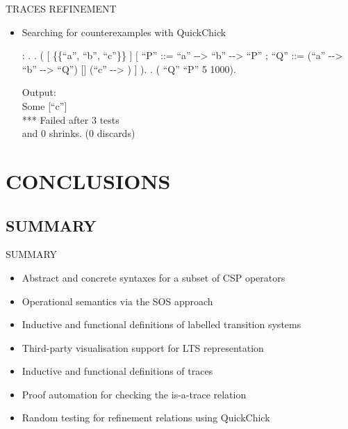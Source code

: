 \documentclass[t]{beamer}
\begin{document}
\begin{frame}{TRACES REFINEMENT}
	\begin{itemize}
		\item Searching for counterexamples with QuickChick\\
		\vspace{2mm}
		\small
		\begin{coqdoccode}
			\coqdocnoindent
			  : .\coqdoceol
			\coqdocnoindent
			.\coqdoceol
			\coqdocindent{1.00em}
			 (\coqdoceol
			\coqdocindent{2.00em}
			\coqdoceol
			\coqdocindent{3.00em}
			[  \{\{``a'', ``b'', ``c''\}\} ]\coqdoceol
			\coqdocindent{3.00em}
			[ ``P'' ::= ``a'' -{}-> ``b'' -{}->  ``P'' ;\coqdoceol
			\coqdocindent{4.00em}
			``Q'' ::= (``a'' -{}-> ``b'' -{}->  ``Q'') [] (``c'' -{}-> ) ]\coqdoceol
			\coqdocindent{1.00em}
			).\coqdoceol
			\coqdocnoindent
			.\coqdoceol
			\coqdocemptyline
			\coqdocnoindent
			 (  ``Q'' ``P'' 5 1000).\coqdoceol
		\end{coqdoccode}
		\vspace{2mm}
		Output:\\
		\ttfamily
		Some {[``c'']}\\
		*** Failed after 3 tests\\
		and 0 shrinks. (0 discards)
	\end{itemize}
\end{frame}

\section{CONCLUSIONS}

\subsection{SUMMARY}

\begin{frame}{SUMMARY}
	\begin{itemize}
		\item Abstract and concrete syntaxes for a subset of CSP operators
		\item Operational semantics via the SOS approach
		\item Inductive and functional definitions of labelled transition systems
		\item Third-party visualisation support for LTS representation
		\item Inductive and functional definitions of traces
		\item Proof automation for checking the is-a-trace relation
		\item Random testing for refinement relations using QuickChick
	\end{itemize}
\end{frame}
\end{document}
